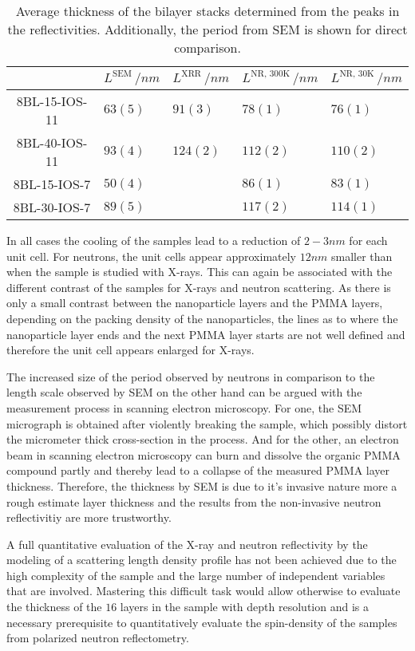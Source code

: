 \documentclass[\main/dresen_thesis.tex]{subfiles}
\begin{document}
  \begin{table}[tb]
    \centering
    \caption{\label{tab:looselyPackedNP:bilayerStacks:reflPeriodLengths}Average thickness of the bilayer stacks determined from the peaks in the reflectivities. Additionally, the period from SEM is shown for direct comparison.}
    \begin{tabular}{ c | l | l | l | l}
      \rule{0pt}{2ex} & $L^\mathrm{SEM} \, / \unit{nm}$ & $L^\mathrm{XRR} \, / \unit{nm}$ & $L^\mathrm{NR,\,300K}\, / \unit{nm}$ & $L^\mathrm{NR,\,30K}\, / \unit{nm}$ \\
      \hline
      \rule{0pt}{2ex} 8BL-15-IOS-11    & $63(5)$    & $91(3)$     & $78(1)$  & $76(1)$\\
      \rule{0pt}{2ex} 8BL-40-IOS-11    & $93(4)$    & $124(2)$    & $112(2)$ & $110(2)$\\
      \rule{0pt}{2ex} 8BL-15-IOS-7     & $50(4)$    &             & $86(1)$  & $83(1)$\\
      \rule{0pt}{2ex} 8BL-30-IOS-7     & $89(5)$    &             & $117(2)$ & $114(1)$\\
      \hline
    \end{tabular}
  \end{table}

  In all cases the cooling of the samples lead to a reduction of $2 - 3 \unit{nm}$ for each unit cell.
  For neutrons, the unit cells appear approximately $12 \unit{nm}$ smaller than when the sample is studied with X-rays.
  This can again be associated with the different contrast of the samples for X-rays and neutron scattering.
  As there is only a small contrast between the nanoparticle layers and the PMMA layers, depending on the packing density of the nanoparticles, the lines as to where the nanoparticle layer ends and the next PMMA layer starts are not well defined and therefore the unit cell appears enlarged for X-rays.

  The increased size of the period observed by neutrons in comparison to the length scale observed by SEM on the other hand can be argued with the measurement process in scanning electron microscopy.
  For one, the SEM micrograph is obtained after violently breaking the sample, which possibly distort the micrometer thick cross-section in the process.
  And for the other, an electron beam in scanning electron microscopy can burn and dissolve the organic PMMA compound partly and thereby lead to a collapse of the measured PMMA layer thickness.
  Therefore, the thickness by SEM is due to it's invasive nature more a rough estimate layer thickness and the results from the non-invasive neutron reflectivitiy are more trustworthy.

  A full quantitative evaluation of the X-ray and neutron reflectivity by the modeling of a scattering length density profile has not been achieved due to the high complexity of the sample and the large number of independent variables that are involved.
  Mastering this difficult task would allow otherwise to evaluate the thickness of the $16$ layers in the sample with depth resolution and is a necessary prerequisite to quantitatively evaluate the spin-density of the samples from polarized neutron reflectometry.
\end{document}
